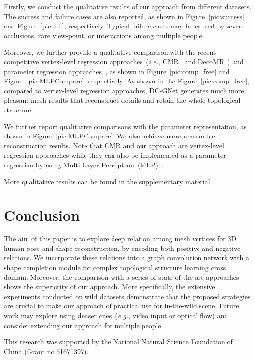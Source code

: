 \documentclass[sigplan]{acmart}
\def\eg{\emph{e.g.}}
\def\ie{\emph{i.e.}}
\begin{document}
Firstly, we conduct the qualitative results of our approach from different datasets. The success and failure cases are also reported, as shown in Figure~\ref{pic:success} and Figure~\ref{pic:fail}, respectively. Typical failure cases may be caused by severe occlusions, rare view-point, or interactions among multiple people. 

Moreover, we further provide a qualitative comparison with the recent competitive vertex-level regression approaches~(\ie, CMR~\cite{kolotouros2019convolutional} and DecoMR~\cite{DenseCorrespondence}) and parameter regression approaches~\cite{kanazawa2018end-to-end,kolotouros2019spin}, as shown in Figure~\ref{pic:comp_free} and Figure~\ref{pic:MLPCompare}, respectively. 
As shown in the Figure~\ref{pic:comp_free}, compared to vertex-level regression approaches, DC-GNet generates much more pleasant mesh results that reconstruct details and retain the whole topological structure.

We further report qualitative comparisons with the parameter representation, as shown in Figure~\ref{pic:MLPCompare}. We also achieve more reasonable reconstruction results. Note that CMR and our approach are vertex-level regression approaches while they can also be implemented as a parameter regression by using Multi-Layer Perceptron~(MLP)~\cite{MLP}.

More qualitative results can be found in the supplementary material.
\section{Conclusion}

The aim of this paper is to explore deep relation among mesh vertices for 3D human pose and shape reconstruction, by encoding both positive and negative relations. We incorporate these relations into a graph convolution network with a shape completion module for complex topological structure learning cross domain. 
Moreover, the comparison with a series of state-of-the-art approaches shows the superiority of our approach. More specifically, the extensive experiments conducted on wild datasets demonstrate that the proposed strategies are crucial to make our approach of practical use for in-the-wild scene. Future work may explore using denser cues~(\eg, video input or optical flow) and consider extending our approach for multiple people.

\begin{acks}
  This research was supported by the National Natural Science Foundation of China (Grant no 61671397).
\end{acks}



\end{document}
